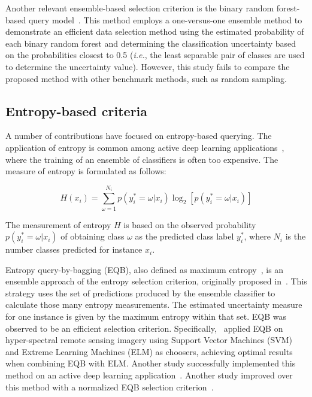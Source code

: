 \documentclass[preprint,12pt]{elsarticle}
\begin{document}
Another relevant ensemble-based selection criterion is the binary random
forest-based query model~\cite{Su2020}. This method employs a one-versus-one
ensemble method to demonstrate an efficient data selection method using the
estimated probability of each binary random forest and determining the
classification uncertainty based on the probabilities closest to 0.5
(\textit{i.e.}, the least separable pair of classes are used to determine the
uncertainty value). However, this study fails to compare the proposed method
with other benchmark methods, such as random sampling.

\subsection{Entropy-based criteria}

A number of contributions have focused on entropy-based querying. The
application of entropy is common among active deep learning
applications~\cite{Aghdam2019}, where the training of an ensemble of
classifiers is often too expensive. The measure of entropy is formulated as
follows:

\begin{equation*}
    H(x_i) = \sum_{\omega=1}^{N_i}{p(y_{i}^{*}=\omega|x_i)}\log_2[p(y_{i}^{*}=\omega|x_i)]
\end{equation*}

The measurement of entropy $H$ is based on the observed probability
$p(y_{i}^{*}=\omega|x_i)$ of obtaining class $\omega$ as the predicted class
label $y_{i}^{*}$, where $N_i$ is the number classes predicted for instance  
$x_i$.

Entropy query-by-bagging (EQB), also defined as maximum
entropy~\cite{Liu2020}, is an ensemble approach of the entropy selection
criterion, originally proposed in~\cite{Tuia2009}. This strategy uses the set
of predictions produced by the ensemble classifier to calculate those many
entropy measurements. The estimated uncertainty measure for one instance is
given by the maximum entropy within that set. EQB was observed to be an
efficient selection criterion. Specifically,~\cite{Shrivastava2021} applied
EQB on hyper-spectral remote sensing imagery using Support Vector Machines
(SVM) and Extreme Learning Machines (ELM) as choosers, achieving optimal
results when combining EQB with ELM\@. Another study successfully implemented
this method on an active deep learning application~\cite{Liu2020}. Another
study improved over this method with a normalized EQB selection
criterion~\cite{Copa2010}.
\end{document}
